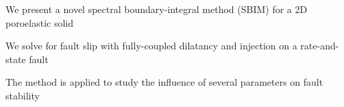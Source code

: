 \documentclass[draft]{agujournal2019}
\begin{document}





\begin{keypoints}
\item We present a novel spectral boundary-integral method (SBIM) for a 2D poroelastic solid
\item We solve for fault slip with fully-coupled dilatancy and injection on a rate-and-state fault
\item The method is applied to study the influence of several parameters on fault stability
\end{keypoints}

%
%

%
%
\end{document}
